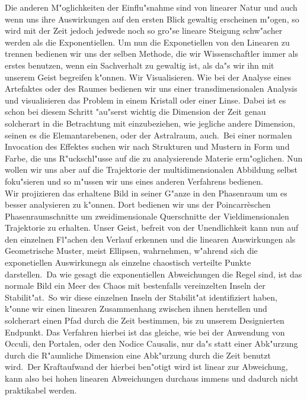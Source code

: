 \documentclass[a5paper,8pt]{book}
\begin{document}
Die anderen M"oglichkeiten der Einflu"snahme sind von linearer Natur und auch wenn uns ihre Auswirkungen auf den ersten Blick gewaltig erscheinen m"ogen, so wird mit der Zeit 
jedoch jedwede noch so gro"se lineare Steigung schw"acher werden als die Exponentiellen.
Um nun die Exponetiellen von den Linearen zu trennen bedienen wir uns der selben Methode, die wir Wissenschaftler immer als erstes benutzen, wenn ein Sachverhalt zu gewaltig 
ist, als da"s wir ihn mit unserem Geist begreifen k"onnen. Wir Visualisieren. Wie bei der Analyse eines Artefaktes oder des Raumes bedienen wir uns einer transdimensionalen 
Analysis und visualisieren das Problem in einem Kristall oder einer Linse. Dabei ist es schon bei diesem Schritt "au"serst wichtig die Dimension der Zeit genau solcherart in 
die Betrachtung mit einzubeziehen, wie jegliche andere Dimension, seinen es die Elemantarebenen, oder der Astralraum, auch.\
Bei einer normalen Invocation des Effektes suchen wir nach Strukturen und Mustern in Form und Farbe, die uns R"uckschl"usse auf die zu analysierende Materie erm"oglichen.
Nun wollen wir uns aber auf die Trajektorie der multidimensionalen Abbildung selbst foku"sieren und so m"ussen wir uns eines anderen Verfahrens bedienen.\\
Wir projizieren das erhaltene Bild in seiner G"anze in den Phasenraum um es besser analysieren zu k"onnen. Dort bedienen wir uns der Poincarr\`{e}schen Phasenraumschnitte 
um zweidimensionale Querschnitte der Vieldimensionalen Trajektorie zu erhalten.
Unser Geist, befreit von der Unendlichkeit kann nun auf den einzelnen Fl"achen den Verlauf erkennen und die linearen Auswirkungen als Geometrische Muster, meist Ellipsen, 
wahrnehmen, w"ahrend sich die exponetiellen Auswirkunegn als einzelne chaostisch verteilte Punkte darstellen.\
Da wie gesagt die exponentiellen Abweichungen die Regel sind, ist das normale Bild ein Meer des Chaos mit bestenfalls vereinzelten Inseln der Stabilit"at.\
So wir diese einzelnen Inseln der Stabilit"at identifiziert haben, k"onne wir einen linearen Zusammenhang zwischen ihnen herstellen und solcherart einen Pfad durch die Zeit 
bestimmen, bis zu unserem Designierten Endpunkt.
Das Verfahren hierbei ist das gleiche, wie bei der Anwendung von Occuli, den Portalen, oder den Nodice Causalis, nur da"s statt einer Abk"urzung durch die R"aumliche Dimension 
eine Abk"urzung durch die Zeit benutzt wird.\
Der Kraftaufwand der hierbei ben"otigt wird ist linear zur Abweichung, kann also bei hohen linearen Abweichungen durchaus immens und dadurch nicht praktikabel werden.\\
\end{document}
